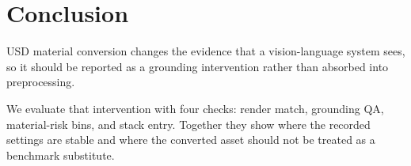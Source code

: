 \section{Conclusion}
\label{sec:conclusion}

USD material conversion changes the evidence that a
vision-language system sees, so it should be reported as a grounding
intervention rather than absorbed into preprocessing.

We evaluate that intervention with four checks: render match, grounding QA,
material-risk bins, and stack entry. Together they show where the recorded
settings are stable and where the converted asset should not be treated as a
benchmark substitute.
